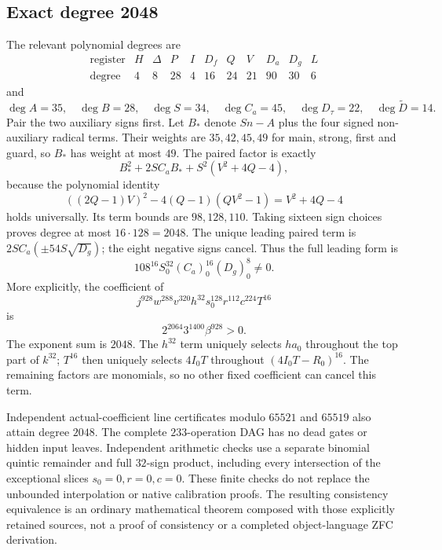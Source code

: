 \subsection{Exact degree 2048}
The relevant polynomial degrees are
\[
\begin{array}{c|rrrrrrrrrr}
\text{register}&H&\Delta&P&I&D_f&Q&V&D_a&D_g&L\\\hline
\text{degree}&4&8&28&4&16&24&21&90&30&6
\end{array}
\]
and
\[
 \deg A=35,\quad\deg B=28,\quad\deg S=34,
 \quad\deg C_a=45,\quad\deg D_\tau=22,
 \quad\deg\widetilde D=14.
\]
Pair the two auxiliary signs first. Let $B_*$ denote $Sn-A$ plus
the four signed non-auxiliary radical terms. Their weights are
$35,42,45,49$ for main, strong, first and guard, so $B_*$ has weight
at most $49$. The paired factor is exactly
\[
 B_*^2+2SC_aB_*+S^2(V^2+4Q-4),
\]
because the polynomial identity
\[
 ((2Q-1)V)^2-4(Q-1)(QV^2-1)=V^2+4Q-4
\]
holds universally. Its term bounds are $98,128,110$. Taking sixteen
sign choices proves degree at most $16\cdot128=2048$.
The unique leading paired term is
$2SC_a(\mathbin{\pm}54S\sqrt{D_g})$; the eight negative signs cancel.
Thus the full leading form is
\[
 108^{16}S_0^{32}(C_a)_0^{16}(D_g)_0^8\ne0.
\]
More explicitly, the coefficient of
\[
 j^{928}w^{288}v^{320}h^{32}s_0^{128}r^{112}c^{224}T^{16}
\]
is
\[
 \boxed{2^{2064}3^{1400}\beta^{928}>0.}
\]
The exponent sum is $2048$. The $h^{32}$ term uniquely selects
$ha_0$ throughout the top part of $k^{32}$; $T^{16}$ then uniquely
selects $4I_0T$ throughout $(4I_0T-R_0)^{16}$. The remaining factors
are monomials, so no other fixed coefficient can cancel this term.

Independent actual-coefficient line certificates modulo $65521$ and
$65519$ also attain degree $2048$. The complete $233$-operation DAG
has no dead gates or hidden input leaves. Independent arithmetic checks
use a separate binomial quintic remainder and full $32$-sign product,
including every intersection of the exceptional slices $s_0=0,r=0,c=0$.
These finite checks do not replace the unbounded interpolation or
native calibration proofs. The resulting consistency equivalence is an
ordinary mathematical theorem composed with those explicitly retained
sources, not a proof of consistency or a completed object-language
ZFC derivation.
